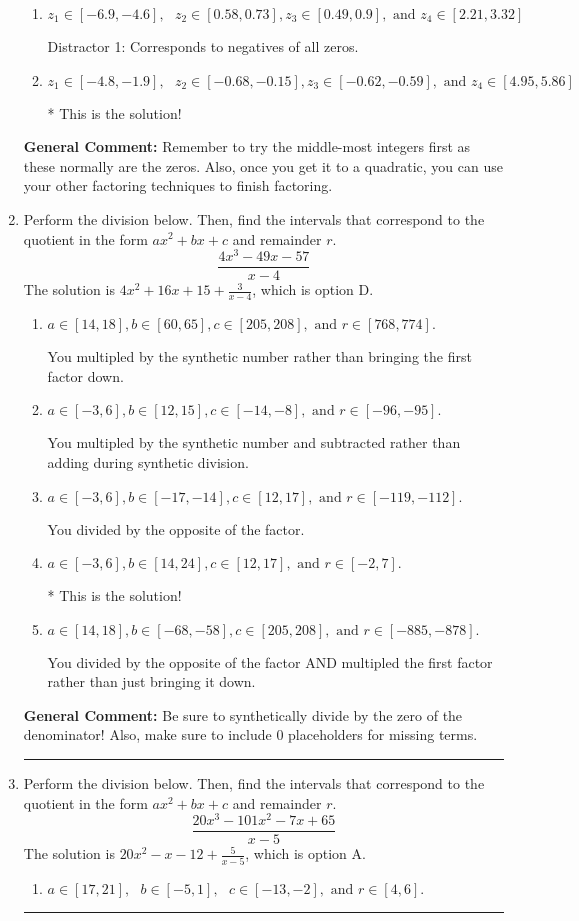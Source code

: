 \documentclass{extbook}[14pt]
\newcommand{\litem}[1]{\item #1

\rule{\textwidth}{0.4pt}}
\begin{document}
\begin{enumerate}
{\begin{enumerate}[label=\Alph*.]
 Distractor 4: Corresponds to moving factors from one rational to another.
\item \( z_1 \in [-6.9, -4.6], \text{   }  z_2 \in [0.58, 0.73], z_3 \in [0.49, 0.9], \text{   and   } z_4 \in [2.21, 3.32] \)

 Distractor 1: Corresponds to negatives of all zeros.
\item \( z_1 \in [-4.8, -1.9], \text{   }  z_2 \in [-0.68, -0.15], z_3 \in [-0.62, -0.59], \text{   and   } z_4 \in [4.95, 5.86] \)

* This is the solution!
\end{enumerate}

\textbf{General Comment:} Remember to try the middle-most integers first as these normally are the zeros. Also, once you get it to a quadratic, you can use your other factoring techniques to finish factoring.
}
\litem{
Perform the division below. Then, find the intervals that correspond to the quotient in the form $ax^2+bx+c$ and remainder $r$.
\[ \frac{4x^{3} -49 x -57}{x -4} \]The solution is \( 4x^{2} +16 x + 15 + \frac{3}{x -4} \), which is option D.\begin{enumerate}[label=\Alph*.]
\item \( a \in [14, 18], b \in [60, 65], c \in [205, 208], \text{ and } r \in [768, 774]. \)

 You multipled by the synthetic number rather than bringing the first factor down.
\item \( a \in [-3, 6], b \in [12, 15], c \in [-14, -8], \text{ and } r \in [-96, -95]. \)

 You multipled by the synthetic number and subtracted rather than adding during synthetic division.
\item \( a \in [-3, 6], b \in [-17, -14], c \in [12, 17], \text{ and } r \in [-119, -112]. \)

 You divided by the opposite of the factor.
\item \( a \in [-3, 6], b \in [14, 24], c \in [12, 17], \text{ and } r \in [-2, 7]. \)

* This is the solution!
\item \( a \in [14, 18], b \in [-68, -58], c \in [205, 208], \text{ and } r \in [-885, -878]. \)

 You divided by the opposite of the factor AND multipled the first factor rather than just bringing it down.
\end{enumerate}

\textbf{General Comment:} Be sure to synthetically divide by the zero of the denominator! Also, make sure to include 0 placeholders for missing terms.
}
\litem{
Perform the division below. Then, find the intervals that correspond to the quotient in the form $ax^2+bx+c$ and remainder $r$.
\[ \frac{20x^{3} -101 x^{2} -7 x + 65}{x -5} \]The solution is \( 20x^{2} -x -12 + \frac{5}{x -5} \), which is option A.\begin{enumerate}[label=\Alph*.]
\item \( a \in [17, 21], \text{   } b \in [-5, 1], \text{   } c \in [-13, -2], \text{   and   } r \in [4, 6]. \)


\end{enumerate}}
\end{enumerate}
\end{document}
